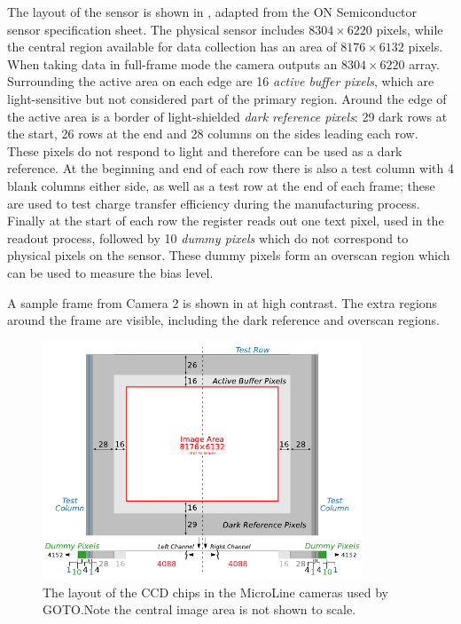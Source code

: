 \begin{colsection}
\begin{colsection}
The layout of the sensor is shown in , adapted from the ON Semiconductor sensor specification sheet. The physical sensor includes $8304 \times 6220$ pixels, while the central region available for data collection has an area of $8176 \times 6132$ pixels. When taking data in full-frame mode the camera outputs an $8304 \times 6220$ array. Surrounding the active area on each edge are 16 \emph{active buffer pixels}, which are light-sensitive but not considered part of the primary region. Around the edge of the active area is a border of light-shielded \emph{dark reference pixels}: 29 dark rows at the start, 26 rows at the end and 28 columns on the sides leading each row. These pixels do not respond to light and therefore can be used as a dark reference. At the beginning and end of each row there is also a test column with 4 blank columns either side, as well as a test row at the end of each frame; these are used to test charge transfer efficiency during the manufacturing process. Finally at the start of each row the register reads out one text pixel, used in the readout process, followed by 10 \emph{dummy pixels} which do not correspond to physical pixels on the sensor. These dummy pixels form an overscan region which can be used to measure the bias level.

A sample frame from Camera 2 is shown in  at high contrast. The extra regions around the frame are visible, including the dark reference and overscan regions.

\begin{figure}[p]
    \begin{center}
        \includegraphics[width=0.85\textwidth]{images/chip}
    \end{center}
    \caption[The layout of the CCD chips in the MicroLine cameras used by GOTO]{
        The layout of the CCD chips in the MicroLine cameras used by GOTO.\@ Note the central image area is not shown to scale.
    }\label{fig:chip}
\end{figure}


\end{colsection}
\end{colsection}
